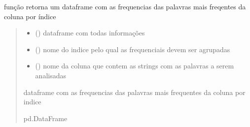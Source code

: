 \documentclass[letterpaper,10pt,english]{sphinxmanual}
\begin{document}
\begin{fulllineitems}
\label{\detokenize{index:functions.words_freq}}
\pysigstartsignatures
{}
\pysigstopsignatures
\sphinxAtStartPar
função retorna um dataframe com as frequencias das palavras mais freqentes da coluna por índice
\begin{quote}\begin{description}
\begin{itemize}
\item {} 
\sphinxAtStartPar
{} () \textendash{} dataframe com todas informações

\item {} 
\sphinxAtStartPar
{} () \textendash{} nome do indice pelo qual as frequenciais devem ser agrupadas

\item {} 
\sphinxAtStartPar
{} () \textendash{} nome da coluna que contem as strings com as palavras a serem analisadas

\end{itemize}

\sphinxAtStartPar
dataframe com as frequencias das palavras mais frequentes da coluna por indice

\sphinxAtStartPar
pd.DataFrame

\end{description}\end{quote}

\end{fulllineitems}

\end{document}
